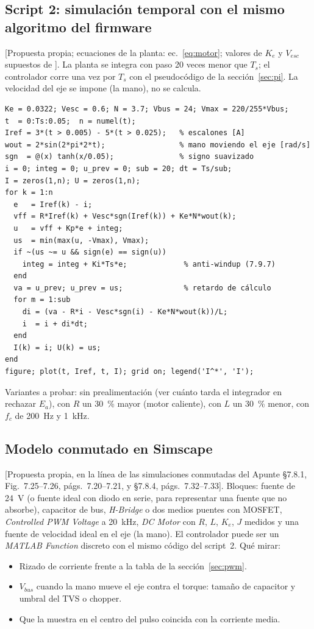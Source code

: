 \documentclass[11pt,a4paper]{article}
\newcommand{\code}[1]{\texttt{\detokenize{#1}}}
\newcommand{\fuente}[1]{{\footnotesize\textcolor{black!60}{[#1]}}}
\begin{document}
\subsection{Script 2: simulación temporal con el mismo algoritmo del firmware}
\fuente{Propuesta propia; ecuaciones de la planta: ec.~\eqref{eq:motor}; valores de $K_e$ y $V_{esc}$ supuestos de \code{caracterizacion_motor_775.tex}}. La planta se integra con paso 20 veces menor que $T_s$; el controlador corre una vez por $T_s$ con el pseudocódigo de la sección~\ref{sec:pi}. La velocidad del eje se impone (la mano), no se calcula.
\begin{lstlisting}[language=matlabsimple]
Ke = 0.0322; Vesc = 0.6; N = 3.7; Vbus = 24; Vmax = 220/255*Vbus;
t  = 0:Ts:0.05;  n = numel(t);
Iref = 3*(t > 0.005) - 5*(t > 0.025);   % escalones [A]
wout = 2*sin(2*pi*2*t);                 % mano moviendo el eje [rad/s]
sgn  = @(x) tanh(x/0.05);               % signo suavizado
i = 0; integ = 0; u_prev = 0; sub = 20; dt = Ts/sub;
I = zeros(1,n); U = zeros(1,n);
for k = 1:n
  e   = Iref(k) - i;
  vff = R*Iref(k) + Vesc*sgn(Iref(k)) + Ke*N*wout(k);
  u   = vff + Kp*e + integ;
  us  = min(max(u, -Vmax), Vmax);
  if ~(us ~= u && sign(e) == sign(u))
    integ = integ + Ki*Ts*e;             % anti-windup (7.9.7)
  end
  va = u_prev; u_prev = us;              % retardo de cálculo
  for m = 1:sub
    di = (va - R*i - Vesc*sgn(i) - Ke*N*wout(k))/L;
    i  = i + di*dt;
  end
  I(k) = i; U(k) = us;
end
figure; plot(t, Iref, t, I); grid on; legend('I^*', 'I');
\end{lstlisting}
Variantes a probar: sin prealimentación (ver cuánto tarda el integrador en rechazar $E_a$), con $R$ un 30~\% mayor (motor caliente), con $L$ un 30~\% menor, con $f_c$ de 200~Hz y 1~kHz.

\subsection{Modelo conmutado en Simscape}
\fuente{Propuesta propia, en la línea de las simulaciones conmutadas del Apunte §7.8.1, Fig.~7.25--7.26, págs.~7.20--7.21, y §7.8.4, págs.~7.32--7.33}. Bloques: fuente de 24~V (o fuente ideal con diodo en serie, para representar una fuente que no absorbe), capacitor de bus, \emph{H-Bridge} o dos medios puentes con MOSFET, \emph{Controlled PWM Voltage} a 20~kHz, \emph{DC Motor} con $R$, $L$, $K_e$, $J$ medidos y una fuente de velocidad ideal en el eje (la mano). El controlador puede ser un \emph{MATLAB Function} discreto con el mismo código del script~2. Qué mirar:
\begin{itemize}
\item Rizado de corriente frente a la tabla de la sección~\ref{sec:pwm}.
\item $V_{bus}$ cuando la mano mueve el eje contra el torque: tamaño de capacitor y umbral del TVS o chopper.
\item Que la muestra en el centro del pulso coincida con la corriente media.
\end{itemize}
\end{document}
